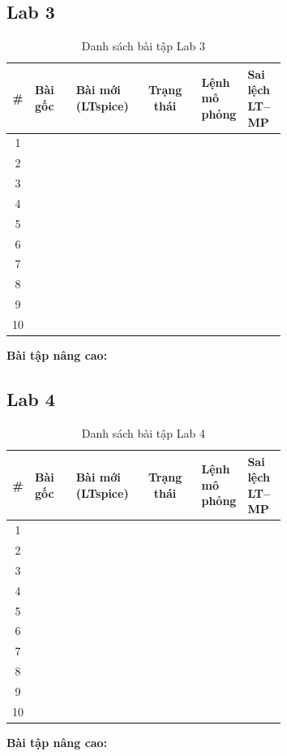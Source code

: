 \subsection{Lab 3}
\renewcommand{\arraystretch}{1.25}
\begin{longtable}{c >{\raggedright}p{0.15\linewidth} >{\raggedright}p{0.22\linewidth} c >{\raggedright}p{0.16\linewidth} p{0.14\linewidth}}
\caption{Danh sách bài tập Lab 3}\\
\toprule
\textbf{\#} & \textbf{Bài gốc} & \textbf{Bài mới (LTspice)} & \textbf{Trạng thái} & \textbf{Lệnh mô phỏng} & \textbf{Sai lệch LT--MP} \\ \midrule
1 & & & & & \\
2 & & & & & \\
3 & & & & & \\
4 & & & & & \\
5 & & & & & \\
6 & & & & & \\
7 & & & & & \\
8 & & & & & \\
9 & & & & & \\
10 & & & & & \\
\bottomrule
\end{longtable}
\noindent\textbf{Bài tập nâng cao:} 

\subsection{Lab 4}
\renewcommand{\arraystretch}{1.25}
\begin{longtable}{c >{\raggedright}p{0.15\linewidth} >{\raggedright}p{0.22\linewidth} c >{\raggedright}p{0.16\linewidth} p{0.14\linewidth}}
\caption{Danh sách bài tập Lab 4}\\
\toprule
\textbf{\#} & \textbf{Bài gốc} & \textbf{Bài mới (LTspice)} & \textbf{Trạng thái} & \textbf{Lệnh mô phỏng} & \textbf{Sai lệch LT--MP} \\ \midrule
1 & & & & & \\
2 & & & & & \\
3 & & & & & \\
4 & & & & & \\
5 & & & & & \\
6 & & & & & \\
7 & & & & & \\
8 & & & & & \\
9 & & & & & \\
10 & & & & & \\
\bottomrule
\end{longtable}
\noindent\textbf{Bài tập nâng cao:} 


